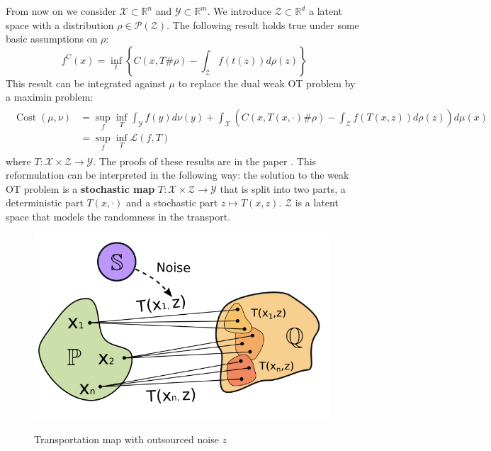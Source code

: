 \documentclass[11pt]{article}
\newcommand{\R}{\mathbb{R}}
\DeclareMathOperator*{\Cost}{\text{Cost}}
\begin{document}
From now on we consider $\mathcal{X}\subset\R^n$ and $\mathcal{Y}\subset\R^m$. We introduce $\mathcal{Z}\subset\R^d$ a latent space with a distribution $\rho\in \mathcal{P}(\mathcal{Z})$. The following result holds true under some basic assumptions on $\rho$:
\begin{equation}
    f^C(x)=\inf_t \left\{C(x, T\#\rho)-\int_{\mathcal{Z}}f(t(z))d\rho(z)\right\}
\end{equation}
This result can be integrated against $\mu$ to replace the dual weak OT problem by a maximin problem:
\begin{align}
    \begin{split}
        \Cost(\mu,\nu) & = \sup_{f} \inf_{T}
        \int_{\mathcal{Y}}f(y)d\nu(y) + \int_{\mathcal{X}} \left( C(x, T(x,\cdot)\#\rho)-\int_{\mathcal{Z}}f(T(x,z))d\rho(z)\right)d\mu(x) \\
                       & = \sup_{f} \inf_{T} \mathcal{L}(f,T)
    \end{split}
    \label{eq:weak_ot_reformulation}
\end{align}
where $T:\mathcal{X}\times\mathcal{Z}\to\mathcal{Y}$. The proofs of these results are in the paper \cite{korotin-2022}. This reformulation can be interpreted in the following way: the solution to the weak OT problem is a \textbf{stochastic map} $T:\mathcal{X}\times \mathcal{Z}\to \mathcal{Y}$ that is split into two parts, a deterministic part $T(x,\cdot)$ and a stochastic part $z\mapsto T(x,z)$. $\mathcal{Z}$ is a latent space that models the randomness in the transport.

\begin{figure}
    \centering
    \includegraphics[width=0.9\linewidth]{figures/transportation-plan.png}
    \label{transportation-map}
    \caption{Transportation map with outsourced noise $z$ \cite{korotin-2022}}
\end{figure}
\end{document}
